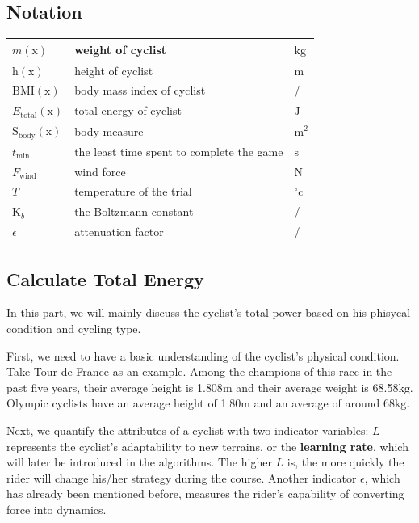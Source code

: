 \documentclass[12pt]{article}
\theoremstyle{definition}
\theoremstyle{remark}
\numberwithin{equation}{section}
\begin{document}
	\subsection{Notation}
	\begin{tabular}{|l|l|l|}
		\hline
		$m(\mathrm{x})$&weight of cyclist&$\mathrm{kg}$\\
		\hline
		$\mathrm{h}(\mathrm{x})$&height of cyclist&$\mathrm{m}$\\
		\hline
		$\mathrm{BMI}(\mathrm{x})$&body mass index of cyclist&/\\
		\hline
		$E_\mathrm{total} (\mathrm{x})$&total energy of cyclist&$\mathrm{J}$\\
		\hline
		$\mathrm{S}_\mathrm{body}(\mathrm{x})$&body measure&$\mathrm{m}^2$\\
		\hline
		$t_\mathrm{min}$&the least time spent to complete the game&$\mathrm{s}$\\
		\hline
		$F_\mathrm{wind}$&wind force&$\mathrm{N}$\\
		\hline
		$T$&temperature of the trial&$^{\circ}\mathrm{c}$\\
		\hline
		$\mathrm{K}_b$&the Boltzmann constant&/\\
		\hline
		$\epsilon$&attenuation factor&/\\
		\hline
	\end{tabular}
	\subsection{Calculate Total Energy}
	In this part, we will mainly discuss the cyclist's total power based on his phisycal condition and cycling type.

	First, we need to have a basic understanding of the cyclist's physical condition. Take Tour de France as an example\cite{france}. Among the champions of this race in the past five years, their average height is 1.808$\mathrm{m}$ and their average weight is 68.58$\mathrm{kg}$. Olympic cyclists have an average height of 1.80$\mathrm{m}$ and an average of around 68$\mathrm{kg}$\cite{weight}.

	Next, we quantify the attributes of a cyclist with two indicator variables: \(L\) represents the cyclist's adaptability to new terrains, or the \textbf{learning rate}, which will later be introduced in the algorithms. The higher \(L\) is, the more quickly the rider will change his/her strategy during the course. Another indicator \(\epsilon\), which has already been mentioned before, measures the rider's capability of converting force into dynamics.
\end{document}
